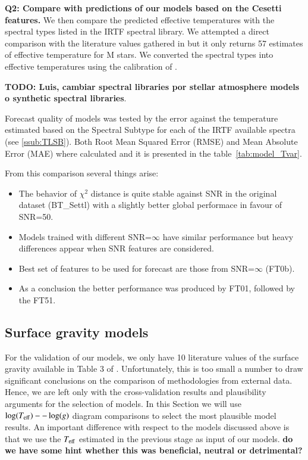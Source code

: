 
{\bf Q2: Compare with predictions of our models based on the Cesetti features.}
We then compare the predicted effective temperatures with the spectral
types listed in the IRTF spectral library. We attempted a direct
comparison with the literature values gathered in \cite{cesetti} but
it only returns 57 estimates of effective temperature for M stars. We
converted the spectral types into effective temperatures using the
calibration of \cite{2009ApJ...702..154S}.

{\bf TODO: Luis, cambiar spectral libraries por stellar atmosphere
models o synthetic spectral libraries}.

Forecast quality of models was tested by the error against the
temperature estimated based on the Spectral Subtype for each of the
IRTF available spectra (see \ref{ssub:TLSB}).  Both Root Mean Squared
Error (RMSE) and Mean Absolute Error (MAE) where calculated and it is
presented in the table~\ref{tab:model_Tvar}.

From this comparison several things arise:
\begin{itemize}
 \item {The behavior of $\chi^2$ distance is quite stable against SNR 
	in the original dataset (BT\_Settl) with a slightly better global 
	performace in favour of SNR=50.}
 \item {Models trained with different SNR=$\infty$ have similar performance but heavy 
	differences appear when SNR features are considered.}
 \item {Best set of features to be used for forecast are those from SNR=$\infty$ (FT0b).}
 \item {As a conclusion the better performance was produced by FT01, followed by the FT51.}
\end{itemize}

\subsection{Surface gravity models}

For the validation of our models, we only have 10 literature values of
the surface gravity available in Table 3 of
\cite{cesetti}. Unfortunately, this is too small a number to draw
significant conclusions on the comparison of methodologies from
external data. Hence, we are left only with the cross-validation
results and plausibility arguments for the selection of models. In
this Section we will use $\log(T_{\rm eff})--\log(g)$ diagram
comparisons to select the most plausible model results. An important
difference with respect to the models discussed above is that we use
the $T_{\rm eff}$ estimated in the previous stage as input of our
models. {\bf do we have some hint whether this was beneficial, neutral
  or detrimental?}

